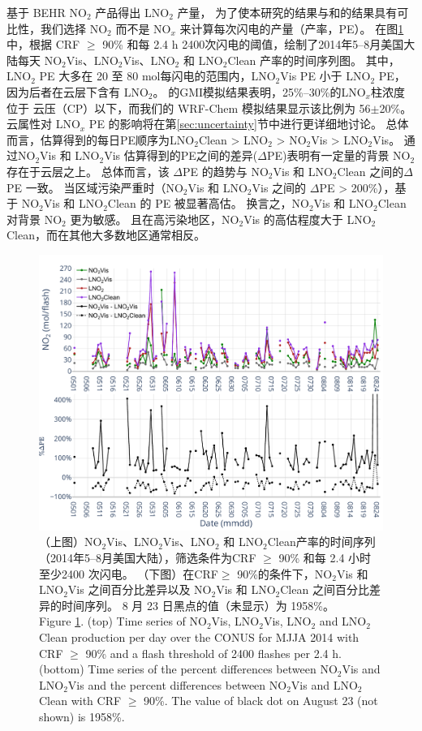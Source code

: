 \citet{Lapierre.2020}基于 BEHR NO$_2$ 产品得出 LNO$_2$ 产量，
为了使本研究的结果与\citet{Pickering.2016}和\citet{Lapierre.2020}的结果具有可比性，我们选择 NO$_2$  而不是 NO$_x$  来计算每次闪电的产量（产率，PE）。
在图\ref{fig:us_pe_timeseries}中，根据 CRF $\geq$ 90\% 和每 2.4 h 2400次闪电的阈值，绘制了2014年5--8月美国大陆每天 NO$_2$Vis、LNO$_2$Vis、LNO$_2$ 和 LNO$_2$Clean 产率的时间序列图。
其中，LNO$_2$ PE 大多在 20 至 80 mol每闪电的范围内，LNO$_2$Vis PE 小于 LNO$_2$ PE，因为后者在云层下含有 LNO$_2$。
\citet{Pickering.2016}的GMI模拟结果表明，25\%--30\%的LNO$_x$柱浓度位于 云压（CP）以下，而我们的 WRF-Chem 模拟结果显示该比例为 56$\pm$20\%。
云属性对 LNO$_x$ PE 的影响将在第\ref{sec:uncertainty}节中进行更详细地讨论。
总体而言，估算得到的每日PE顺序为LNO$_2$Clean > LNO$_2$ > NO$_2$Vis > LNO$_2$Vis。
通过NO$_2$Vis 和 LNO$_2$Vis 估算得到的PE之间的差异($\Delta$PE)表明有一定量的背景 NO$_2$ 存在于云层之上。
总体而言，该 $\Delta$PE 的趋势与 NO$_2$Vis 和 LNO$_2$Clean 之间的$\Delta$PE 一致。
当区域污染严重时（NO$_2$Vis 和 LNO$_2$Vis 之间的 $\Delta$PE > 200\%），基于 NO$_2$Vis 和 LNO$_2$Clean 的 PE 被显著高估。
换言之，NO$_2$Vis 和 LNO$_2$Clean 对背景 NO$_2$ 更为敏感。
且在高污染地区，NO$_2$Vis 的高估程度大于 LNO$_2$Clean，而在其他大多数地区通常相反。

\begin{figure}[!htbp]
\centering
\includegraphics[width=12cm]{./figures/us_pe_timeseries.pdf}
\caption{（上图）NO$_2$Vis、LNO$_2$Vis、LNO$_2$ 和 LNO$_2$Clean产率的时间序列（2014年5--8月美国大陆），筛选条件为CRF $\geq$ 90\% 和每 2.4 小时 至少2400 次闪电。
（下图）在CRF$\geq$ 90\%的条件下，NO$_2$Vis 和 LNO$_2$Vis 之间百分比差异以及 NO$_2$Vis 和 LNO$_2$Clean 之间百分比差异的时间序列。
8 月 23 日黑点的值（未显示）为 1958\%。\\
Figure \ref{fig:us_pe_timeseries}. (top) Time series of NO$_2$Vis, LNO$_2$Vis, LNO$_2$ and LNO$_2$Clean production per day over the CONUS for MJJA 2014 with CRF $\geq$ 90\% and a flash threshold of 2400 flashes per 2.4 h.
(bottom) Time series of the percent differences between NO$_2$Vis and LNO$_2$Vis and the percent differences between NO$_2$Vis and LNO$_2$Clean with CRF $\geq$ 90\%.
The value of black dot on August 23 (not shown) is 1958\%.}
\label{fig:us_pe_timeseries}
\end{figure}

